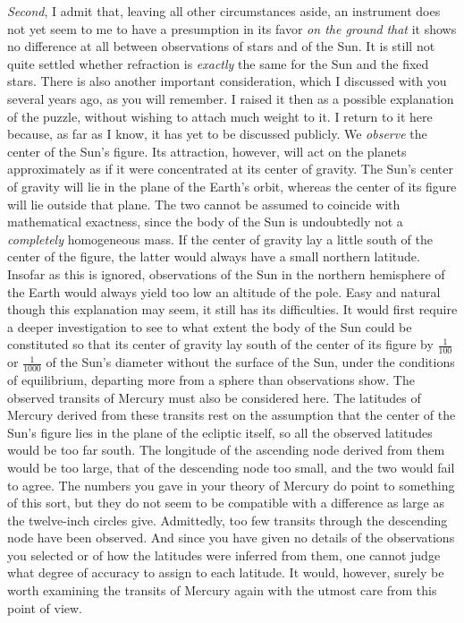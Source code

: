 \par\indent \emph{Second}, I admit that, leaving all other circumstances aside, an instrument does not yet seem to me to have a presumption in its favor \emph{on the ground} \emph{that} it shows no difference at all between observations of stars and of the Sun. It is still not quite settled whether refraction is \emph{exactly} the same for the Sun and the fixed stars. There is also another important consideration, which I discussed with you several years ago, as you will remember. I raised it then as a possible explanation of the puzzle, without wishing to attach much weight to it. I return to it here because, as far as I know, it has yet to be discussed publicly. We \emph{observe} the center of the Sun’s figure. Its attraction, however, will act on the planets approximately as if it were concentrated at its center of gravity. The Sun’s center of gravity will lie in the plane of the Earth’s orbit, whereas the center of its figure will lie outside that plane. The two cannot be assumed to coincide with mathematical exactness, since the body of the Sun is undoubtedly not a \emph{completely} homogeneous mass. If the center of gravity lay a little south of the center of the figure, the latter would always have  a small northern latitude. Insofar as this is ignored, observations of the Sun in the northern hemisphere of the Earth would always yield too low an altitude of the pole. Easy and natural though this explanation may seem, it still has its difficulties. It would first require a deeper investigation to see to what extent the body of the Sun could be constituted so that its center of gravity lay south of the center of its figure by $\frac{1}{100}$ or $\frac{1}{1000}$ of the Sun’s diameter without the surface of the Sun, under the conditions of equilibrium, departing more from a sphere than observations show. The observed transits of Mercury must also be considered here. The latitudes of Mercury derived from these transits rest on the assumption that the center of the Sun’s figure lies in the plane of the ecliptic itself, so all the observed latitudes would be too far south. The longitude of the ascending node derived from them would be too large, that of the descending node too small, and the two would fail to agree. The numbers you gave in your theory of Mercury do point to something of this sort, but they do not seem to be compatible with a difference as large as the twelve-inch circles give. Admittedly, too few transits through the descending node have been observed. And since you have given no details of the observations you selected or of how the latitudes were inferred from them, one cannot judge what degree of accuracy to assign to each latitude. It would, however, surely be worth examining the transits of Mercury again with the utmost care from this point of view.

